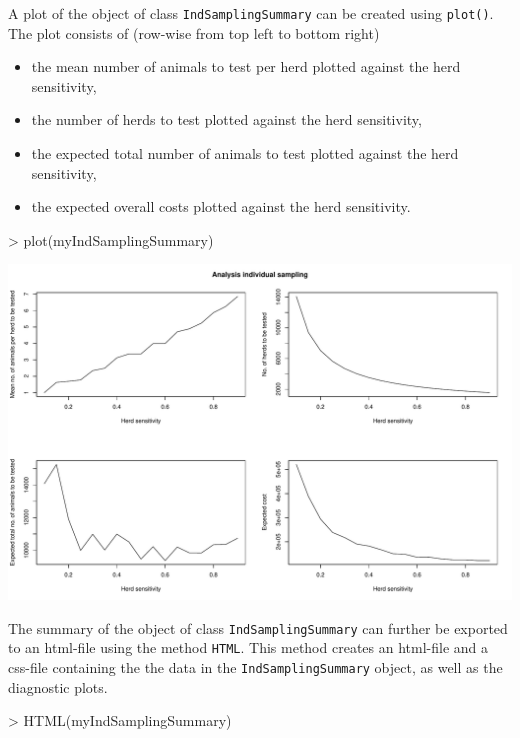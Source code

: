 \documentclass[nojss]{jss}
\begin{document}
  A plot of the object of class \texttt{IndSamplingSummary} can be created using \texttt{plot()}.  The plot consists of (row-wise from top left to bottom right)

\begin{itemize}
\item the mean number of animals to test per herd plotted against the herd sensitivity,
\item the number of herds to test plotted against the herd sensitivity,
\item the expected total number of animals to test plotted against the herd sensitivity,
\item the expected overall costs plotted against the herd sensitivity.
\end{itemize}

\begin{Schunk}
\begin{Sinput}
> plot(myIndSamplingSummary)
\end{Sinput}
\end{Schunk}
\includegraphics{FFD-intro-006}

The summary of the object of class \texttt{IndSamplingSummary} can further be exported to an html-file using the method \texttt{HTML}.  This method creates an html-file and a css-file containing the the data in the \texttt{IndSamplingSummary} object, as well as the diagnostic plots.

\begin{Schunk}
\begin{Sinput}
> HTML(myIndSamplingSummary)
\end{Sinput}
\end{Schunk}
\end{document}
